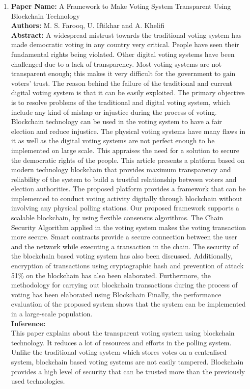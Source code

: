 \documentclass[oneside, 12pt]{book}
\begin{document}
\begin{enumerate}
	\item
	      \textbf{Paper Name:} A Framework to Make Voting System Transparent Using Blockchain Technology \cite{farooq2022framework}\\
	      \textbf{Authors:} M. S. Farooq, U. Iftikhar and A. Khelifi\\
	      \textbf{Abstract:} A widespread mistrust towards the traditional voting system has made democratic voting in any country very critical. People have seen their fundamental rights being violated. Other digital voting systems have been challenged due to a lack of transparency. Most voting systems are not transparent enough; this makes it very difficult for the government to gain voters’ trust. The reason behind the failure of the traditional and current digital voting system is that it can be easily exploited. The primary objective is to resolve problems of the traditional and digital voting system, which include any kind of mishap or injustice during the process of voting. Blockchain technology can be used in the voting system to have a fair election and reduce injustice. The physical voting systems have many flaws in it as well as the digital voting systems are not perfect enough to be implemented on large scale. This appraises the need for a solution to secure the democratic rights of the people. This article presents a platform based on modern technology blockchain that provides maximum transparency and reliability of the system to build a trustful relationship between voters and election authorities. The proposed platform provides a framework that can be implemented to conduct voting activity digitally through blockchain without involving any physical polling stations. Our proposed framework supports a scalable blockchain, by using flexible consensus algorithms. The Chain Security Algorithm applied in the voting system makes the voting transaction more secure. Smart contracts provide a secure connection between the user and the network while executing a transaction in the chain. The security of the blockchain based voting system has also been discussed. Additionally, encryption of transactions using cryptographic hash and prevention of attack 51\% on the blockchain has also been elaborated. Furthermore, the methodology for carrying out blockchain transactions during the process of voting has been elaborated using Blockchain Finally, the performance evaluation of the proposed system shows that the system can be implemented in a large-scale population.\\
	      \textbf{Inference:}
	      \\This paper explains about the transparent voting system using blockchain technology. It reduces a lot of resources and efforts in the polling system. Unlike the traditional voting system which stores votes on a centralised system, blockchain based voting systems are not easily tampered. Blockchain provides a high level of security that can be trusted more than the previously used technologies.

\end{enumerate}
\end{document}
